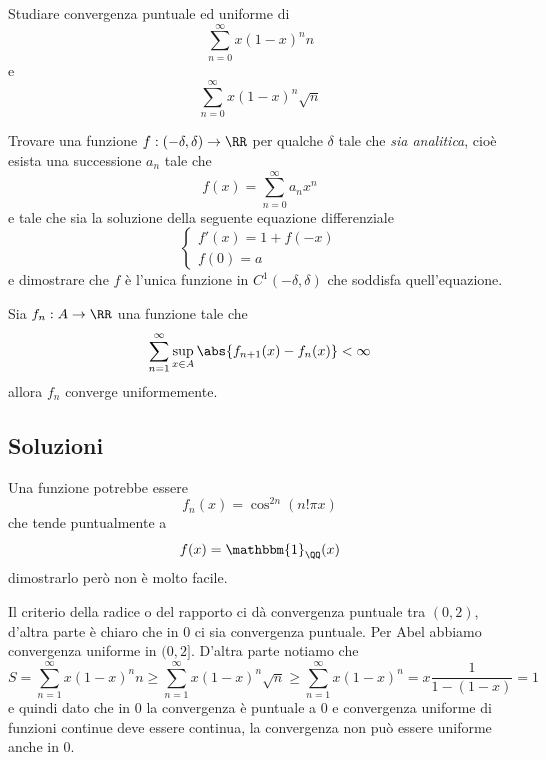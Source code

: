 \documentclass[11pt]{scrartcl}
\begin{document}
	\begin{problem}[Problema 2]
		Studiare convergenza puntuale ed uniforme di 
		$$\sum_{n=0}^{\infty}x\left(1-x\right)^n n$$
		e 
		$$\sum_{n=0}^{\infty}x\left(1-x\right)^n \sqrt{n}$$
	\end{problem}
	\begin{problem}[Problema 3]
		Trovare una funzione $f:(-\delta,\delta)\to\RR$ per qualche $\delta$ tale che \textit{sia analitica}, cioè esista una successione $a_n$ tale che
		$$f(x)=\sum_{n=0}^{\infty}a_nx^n$$
		e tale che sia la soluzione della seguente equazione differenziale
		$$
		\begin{cases}
			f'(x)=1+f(-x) \\
			f(0)=a
		\end{cases}
		$$
		e dimostrare che $f$ è l'unica funzione in $C^1(-\delta,\delta)$ che soddisfa quell'equazione.
	\end{problem}
	\begin{problem}[Problema 4]
		Sia $f_n:A\to\RR$ una funzione tale che
		$$\sum_{n=1}^\infty \sup_{x\in A}\abs{f_{n+1}(x)-f_n(x)}<\infty$$
		allora $f_n$ converge uniformemente.
	\end{problem}
	
	\newpage
	
	\subsection{Soluzioni}
	
	\begin{answer}[Problema 1]
		Una funzione potrebbe essere
		$$f_n(x)=\cos^{2n}(n!\pi x)$$
		che tende puntualmente a 
		$$f(x)=\mathbbm{1}_\QQ(x)$$
		dimostrarlo però non è molto facile.
	\end{answer}
	
	\begin{answer}[Problema 2]
		Il criterio della radice o del rapporto ci dà convergenza puntuale tra $(0,2)$, d'altra parte è chiaro che in $0$ ci sia convergenza puntuale. Per Abel abbiamo convergenza uniforme in $(0,2]$. D'altra parte notiamo che 
		$$S=\sum_{n=1}^{\infty}x\left(1-x\right)^n n\ge \sum_{n=1}^{\infty}x\left(1-x\right)^n \sqrt{n}\ge \sum_{n=1}^{\infty}x\left(1-x\right)^n =x\frac{1}{1-(1-x)}=1$$
		e quindi dato che in $0$ la convergenza è puntuale a $0$ e convergenza uniforme di funzioni continue deve essere continua, la convergenza non può essere uniforme anche in $0$.
	\end{answer}
	
\end{document}

